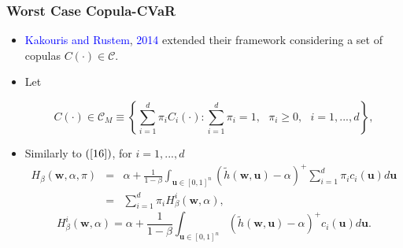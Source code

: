 \documentclass[pdf,9pt,xcolor=dvipsnames,hide notes]{beamer}
\begin{document}
\begin{frame}[label=frame3c]
	\frametitle{Worst Case Copula-CVaR}
	
	\begin{itemize}
		\justifying
		\item   
\textcolor{blue}{Kakouris and Rustem}, \textcolor{blue}{2014}  extended their framework considering a set of copulas $C\left( \cdot \right) \in \mathcal{C}
		$.
		
		\vspace{0.3cm}
		
		\item Let
		
		\begin{equation}
		C\left( \cdot \right) \in \mathcal{C}_{M}\equiv \left\{ \sum_{i=1}^{d}\pi
		_{i}C_{i}\left( \cdot \right) :\sum_{i=1}^{d}\pi _{i}=1,\text{ }\pi _{i}\geq
		0,\text{ }i=1,...,d\right\} ,  \label{28}
		\end{equation}%
		
		\vspace{0.3cm}
		
	\item Similarly to $\left( \ref{16}\right) $, for $i=1,...,d$
		\begin{eqnarray*}
		H_{\beta }\left( \mathbf{w},\alpha ,\pi \right) &=&\alpha +\frac{1}{1-\beta }
		\int_{\mathbf{u}\in \left[ 0,1\right] ^{n}}\left( \widetilde{h}\left( \mathbf{w,u}
		\right) -\alpha \right) ^{+}\sum_{i=1}^{d}\pi _{i}c_{i}\left( \mathbf{u}
		\right) d\mathbf{u}\\
		&=&\sum_{i=1}^{d}\pi _{i}H_{\beta }^{i}\left( \mathbf{w},\alpha \right) ,
	\end{eqnarray*}
		\begin{equation}
		H_{\beta }^{i}\left( \mathbf{w},\alpha \right) =\alpha +\frac{1}{1-\beta }
		\int_{\mathbf{u}\in \left[ 0,1\right] ^{n}}\left( \widetilde{h}\left( \mathbf{w,u}
		\right) -\alpha \right) ^{+}c_{i}\left( \mathbf{u}\right) d\mathbf{u}. \label{30}
		\end{equation}%
	
\end{itemize}	
\end{frame}
\end{document}
